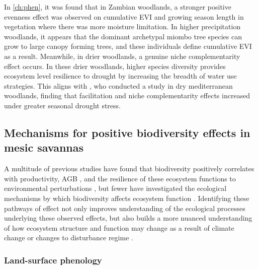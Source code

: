 \begin{refsection}
In \autoref{ch:phen}, it was found that in Zambian woodlands, a stronger positive evenness effect was observed on cumulative EVI and growing season length in vegetation where there was more moisture limitation. In higher precipitation woodlands, it appears that the dominant archetypal miombo tree species can grow to large canopy forming trees, and these individuals define cumulative EVI as a result. Meanwhile, in drier woodlands, a genuine niche complementarity effect occurs. In these drier woodlands, higher species diversity provides ecosystem level resilience to drought by increasing the breadth of water use strategies. This aligns with \citet{Ratcliffe2017}, who conducted a study in dry mediterranean woodlands, finding that facilitation and niche complementarity effects increased under greater seasonal drought stress.

\subsection{Mechanisms for positive biodiversity effects in mesic savannas}
\label{discussion:ssec:mechanism}

A multitude of previous studies have found that biodiversity positively correlates with productivity, AGB \citep{Liang2016}, and the resilience of these ecosystem functions to environmental perturbations \citep{Mori2012}, but fewer have investigated the ecological mechanisms by which biodiversity affects ecosystem function \citep{Barry2019}. Identifying these pathways of effect not only improves understanding of the ecological processes underlying these observed effects, but also builds a more nuanced understanding of how ecosystem structure and function may change as a result of climate change or changes to disturbance regime \citep{Huston2014}.

\subsubsection{Land-surface phenology}
\label{discussion:sssec:phen}


\end{refsection}
